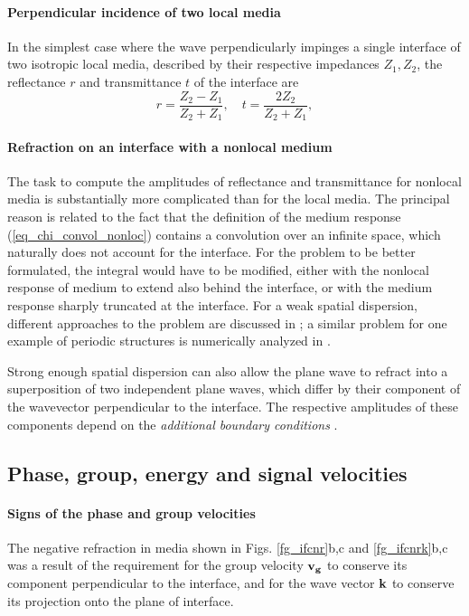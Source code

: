 \paragraph{Perpendicular incidence of two local media} %
In the simplest case where the wave perpendicularly impinges a single interface of two isotropic local media, described by their respective impedances $Z_1, Z_2$, the reflectance $r$ and transmittance $t$ of the interface are
\begin{equation} r = \frac{Z_2 - Z_1}{Z_2+Z_1}, \quad t = \frac{2 Z_2}{Z_2 + Z_1}, \label{eq_reflection}\end{equation}

\paragraph{Refraction on an interface with a nonlocal medium}   %
The task to compute the amplitudes of reflectance and transmittance for nonlocal media is substantially more complicated than for the local media. The principal reason is related to the fact that the definition of the medium response (\ref{eq_chi_convol_nonloc}) contains a convolution over an infinite space, which naturally does not account for the interface. For the problem to be better formulated, the integral would have to be modified, either with the nonlocal response of medium to extend also behind the interface, or with the medium response sharply truncated at the interface. For a weak spatial dispersion, different approaches to the problem are discussed in \cite{golubkov1995boundary}; a similar problem for one example of periodic structures is numerically analyzed in \cite{lapine2012surface}.

Strong enough spatial dispersion can also allow the plane wave to refract into a superposition of two independent plane waves, which differ by their component of the wavevector perpendicular to the interface. The respective amplitudes of these components depend on the \textit{additional boundary conditions} \cite{agranovich2006spatial}.


\subsection{Phase, group, energy and signal velocities}
\label{chap_vfvg}
\paragraph{Signs of the phase and group velocities}%
The negative refraction in media shown in Figs. \ref{fg_ifcnr}b,c and \ref{fg_ifcnrk}b,c was a result of the requirement for the group velocity ${\mathbf{v_g}}$ to conserve its component perpendicular to the interface, and for the wave vector ${\mathbf{k}}$ to conserve its projection onto the plane of interface. 

